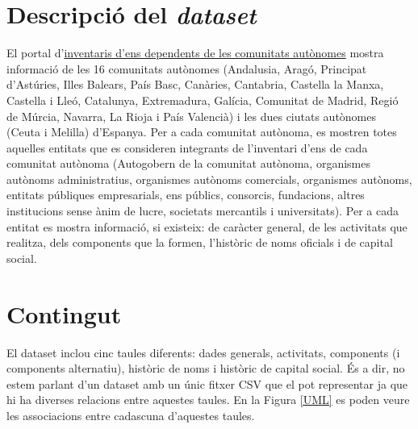 \documentclass[12pt]{article}
\begin{document}
\section*{Descripció del \textit{dataset}}
El portal d'\href{https://serviciostelematicosext.hacienda.gob.es/SGCIEF/PubInvCCAA/secciones/FrmSelComunidad.aspx}{inventaris d'ens dependents de les comunitats autònomes} mostra informació de les 16 comunitats autònomes (Andalusia, Aragó, Principat d'Astúries, Illes Balears, País Basc, Canàries, Cantabria, Castella la Manxa, Castella i Lleó, Catalunya, Extremadura, Galícia, Comunitat de Madrid, Regió de Múrcia, Navarra, La Rioja i País Valencià) i les dues ciutats autònomes (Ceuta i Melilla) d'Espanya. Per a cada comunitat autònoma, es mostren totes aquelles entitats que es consideren integrants de l'inventari d'ens de cada comunitat autònoma (Autogobern de la comunitat autònoma, organismes autònoms administratius, organismes autònoms comercials, organismes autònoms, entitats públiques empresarials, ens públics, consorcis, fundacions, altres institucions sense ànim de lucre, societats mercantils i universitats). Per a cada entitat es mostra informació, si existeix: de caràcter general, de les activitats que realitza, dels components que la formen, l'històric de noms oficials i de capital social.\par

\section*{Contingut}

El dataset inclou cinc taules diferents: dades generals, activitats, components (i components alternatiu), històric de noms i històric de capital social. És a dir, no estem parlant d'un dataset amb un únic fitxer CSV que el pot representar ja que hi ha diverses relacions entre aquestes taules. En la Figura \ref{UML} es poden veure les associacions entre cadascuna d'aquestes taules.
\end{document}
